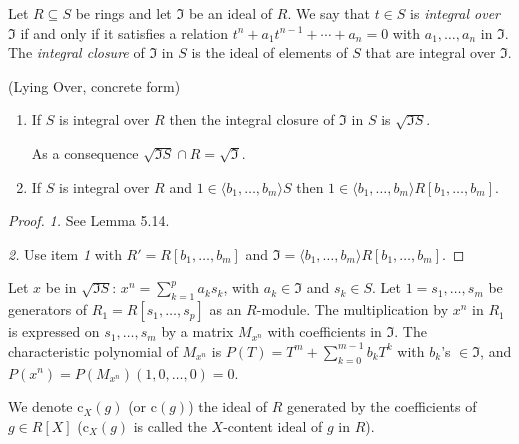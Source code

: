 \documentclass[11pt,a4paper,twoside]{article}
\newcommand{\gothic}{\mathfrak}
\newcommand{\fI}{{\gothic I}}
\newcommand\gen[1]{{\langle #1 \rangle}}
\newcommand{\rc}{\mathrm{c}}
\begin{document}

 Let $R\subseteq S$ be rings and let ${\fI}$ be an ideal of $R$. We say that $t\in S$
is {\em integral over} ${\fI}$ if and only if it satisfies a relation
$t^n+a_1t^{n-1}+ \cdots+a_n = 0$ with $a_1,\dots,a_n$ in ${\fI}$. The {\em integral closure}
of ${\fI}$ in $S$ is the ideal of elements of $S$ that are integral over ${\fI}$.



\goodbreak
\begin{lemma}\label{atiyah} (Lying Over, concrete form)
%
\begin{enumerate}
%
\item If $S$ is integral over $R$ then the integral closure of ${\fI}$ in $S$ is $\sqrt{{\fI}S}$.

\noindent 
As a consequence $\sqrt{{\fI}S}\cap R=\sqrt{{\fI}}$.
%
\item If $S$ is integral over $R$ and $1\in \gen{b_1,\dots,b_m}S$
then $1\in \gen{b_1,\dots,b_m}R[b_1,\dots,b_m]$.
%
\end{enumerate}

\end{lemma}

\begin{proof}
\emph{1.} See \cite{Atiyah} Lemma 5.14.

\noindent \emph{2.} Use item \emph{1} with $R'=R[b_1,\dots,b_m]$
and $\fI=\gen{b_1,\dots,b_m}R[b_1,\dots,b_m]$.
\end{proof}

 Let $x$ be in $\sqrt{{\fI}S}$: $x^n=\sum_{k=1}^{p}a_ks_k$, with $a_k\in {\fI}$ and $s_k\in S$. Let $1=s_1,\dots,s_m$ be generators of 
$R_1=R[s_1,\dots,s_p]$ as an $R$-module. The multiplication by $x^n$ in $R_1$ 
is expressed on $s_1,\dots,s_m$ by a matrix $M_{x^n}$ with coefficients in ${\fI}$.
The characteristic polynomial of $M_{x^n}$ is $P(T)=T^m+\sum_{k=0}^{m-1}b_kT^k$
with $b_k$'s $\in {\fI}$, and $P(x^n)=P(M_{x^n})(1,0,\dots,0)=0$. 

\begin{definition} \label{deficontent}
We denote $\rc_X(g)$ (or $\rc(g)$) the ideal of $R$ generated by the coefficients 
of $g\in R[X]$
($\rc_X(g)$ is called the $X$-content ideal of $g$ in $R$).
\end{definition}
 
\end{document}

